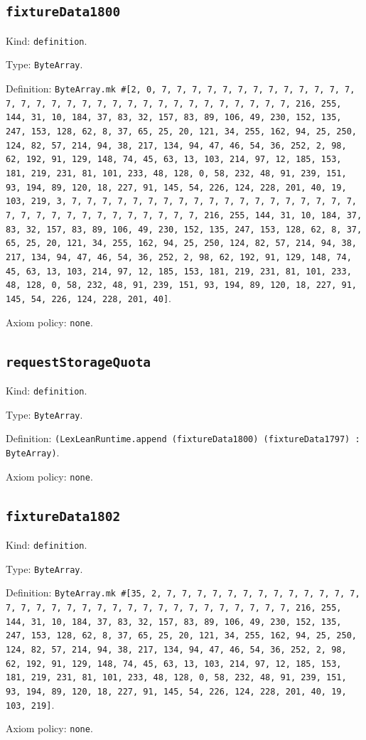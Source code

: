 \documentclass[11pt]{article}
\begin{document}
\subsection*{\texttt{fixtureData1800}}
\noindent Kind: \texttt{definition}.\par
\noindent Type: \texttt{ByteArray}.\par
\noindent Definition: \texttt{ByteArray.mk \#[2, 0, 7, 7, 7, 7, 7, 7, 7, 7, 7, 7, 7, 7, 7, 7, 7, 7, 7, 7, 7, 7, 7, 7, 7, 7, 7, 7, 7, 7, 7, 7, 7, 7, 216, 255, 144, 31, 10, 184, 37, 83, 32, 157, 83, 89, 106, 49, 230, 152, 135, 247, 153, 128, 62, 8, 37, 65, 25, 20, 121, 34, 255, 162, 94, 25, 250, 124, 82, 57, 214, 94, 38, 217, 134, 94, 47, 46, 54, 36, 252, 2, 98, 62, 192, 91, 129, 148, 74, 45, 63, 13, 103, 214, 97, 12, 185, 153, 181, 219, 231, 81, 101, 233, 48, 128, 0, 58, 232, 48, 91, 239, 151, 93, 194, 89, 120, 18, 227, 91, 145, 54, 226, 124, 228, 201, 40, 19, 103, 219, 3, 7, 7, 7, 7, 7, 7, 7, 7, 7, 7, 7, 7, 7, 7, 7, 7, 7, 7, 7, 7, 7, 7, 7, 7, 7, 7, 7, 7, 7, 7, 7, 7, 216, 255, 144, 31, 10, 184, 37, 83, 32, 157, 83, 89, 106, 49, 230, 152, 135, 247, 153, 128, 62, 8, 37, 65, 25, 20, 121, 34, 255, 162, 94, 25, 250, 124, 82, 57, 214, 94, 38, 217, 134, 94, 47, 46, 54, 36, 252, 2, 98, 62, 192, 91, 129, 148, 74, 45, 63, 13, 103, 214, 97, 12, 185, 153, 181, 219, 231, 81, 101, 233, 48, 128, 0, 58, 232, 48, 91, 239, 151, 93, 194, 89, 120, 18, 227, 91, 145, 54, 226, 124, 228, 201, 40]}.\par
\noindent Axiom policy: \texttt{none}.\par
\subsection*{\texttt{requestStorageQuota}}
\noindent Kind: \texttt{definition}.\par
\noindent Type: \texttt{ByteArray}.\par
\noindent Definition: \texttt{(LexLeanRuntime.append (fixtureData1800) (fixtureData1797) : ByteArray)}.\par
\noindent Axiom policy: \texttt{none}.\par
\subsection*{\texttt{fixtureData1802}}
\noindent Kind: \texttt{definition}.\par
\noindent Type: \texttt{ByteArray}.\par
\noindent Definition: \texttt{ByteArray.mk \#[35, 2, 7, 7, 7, 7, 7, 7, 7, 7, 7, 7, 7, 7, 7, 7, 7, 7, 7, 7, 7, 7, 7, 7, 7, 7, 7, 7, 7, 7, 7, 7, 7, 7, 216, 255, 144, 31, 10, 184, 37, 83, 32, 157, 83, 89, 106, 49, 230, 152, 135, 247, 153, 128, 62, 8, 37, 65, 25, 20, 121, 34, 255, 162, 94, 25, 250, 124, 82, 57, 214, 94, 38, 217, 134, 94, 47, 46, 54, 36, 252, 2, 98, 62, 192, 91, 129, 148, 74, 45, 63, 13, 103, 214, 97, 12, 185, 153, 181, 219, 231, 81, 101, 233, 48, 128, 0, 58, 232, 48, 91, 239, 151, 93, 194, 89, 120, 18, 227, 91, 145, 54, 226, 124, 228, 201, 40, 19, 103, 219]}.\par
\noindent Axiom policy: \texttt{none}.\par
\end{document}
